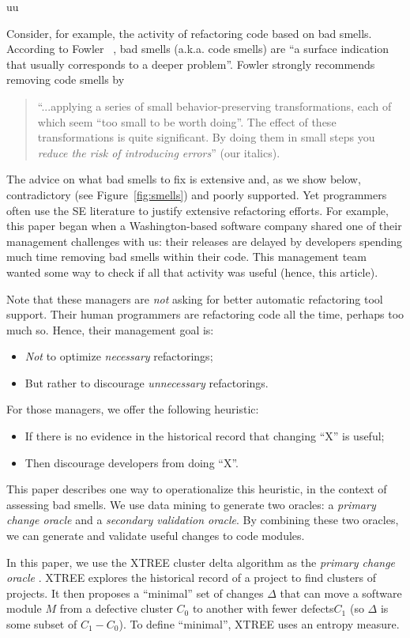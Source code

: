 uu \documentclass[final,twocolumn,5p]{elsarticle}
\newcommand{\bi}{\begin{itemize}[leftmargin=0.4cm]}
\newcommand{\ei}{\end{itemize}}
\newcommand{\fig}[1]{Figure~\ref{fig:#1}}
\theoremstyle{break}
\begin{document}
Consider, for example, the activity of refactoring code based on bad smells.
According to   Fowler ~\cite{fowler99}, bad smells (a.k.a. code smells)
are ``a surface indication that usually corresponds to a deeper problem''.
Fowler strongly recommends   removing   code smells   by
\begin{quote}
``...applying a series of small behavior-preserving transformations, each 
of which seem ``too small to be worth doing''. 
The  effect of   these transformations is quite significant. By doing them in small steps you {\em reduce the risk 
of introducing errors}'' (our italics).
\end{quote}
The advice on what  bad smells to fix is extensive and, as we show below,
contradictory (see \fig{smells}) and poorly supported. Yet
programmers often use the SE literature to justify extensive refactoring efforts.
For example, this paper began when a Washington-based software company shared
one of their management challenges with us: their  releases are delayed by developers spending  much time removing bad smells within their code. This management team wanted some way to check if all that activity was useful (hence, this article).
 
Note that these managers are {\em not} asking for better
automatic refactoring
tool support. Their human programmers are refactoring
code all the time, perhaps too much so.
Hence, their management goal is: 
\bi
\item
{\em Not} to optimize {\em necessary} refactorings;
\item
But rather to discourage {\em unnecessary} refactorings.
\ei
For those managers, we offer the  following heuristic:
\bi
\item If there is no evidence in the historical record that changing ``X'' is useful;
\item Then discourage developers from doing ``X''.
\ei
This paper describes one way to operationalize this heuristic, in the context
of assessing bad smells. We use data mining to generate two oracles: a {\em primary
change oracle} and a {\em secondary validation oracle}.
By combining these two oracles,
 we can generate and validate useful
changes to code modules.

In this paper, we use 
the XTREE cluster delta algorithm as the {\em primary change  oracle} .
XTREE 
explores the historical record of a project to find clusters of projects.
It then proposes a ``minimal'' set of changes $\Delta$ that can move a software module $M$ from a defective cluster $C_0$ to another with fewer defects$C_1$ (so $\Delta$
is some subset of $C_1 - C_0$). To define ``minimal'', XTREE uses an entropy measure.
\end{document}
